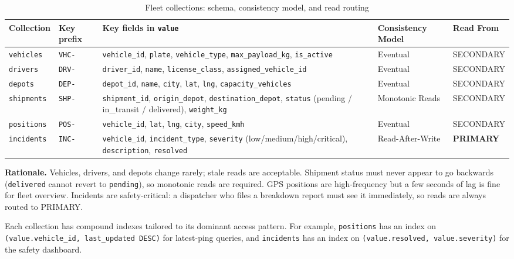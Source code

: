 \documentclass[12pt,a4paper]{article}
\newcommand{\code}[1]{\texttt{\small #1}}
\begin{document}
\begin{table}[H]
  \centering
  \caption{Fleet collections: schema, consistency model, and read routing}
  \label{tab:collections}
  \small
  \begin{tabularx}{\textwidth}{llXll}
    \toprule
    Collection      & Key prefix & Key fields in \texttt{value} & Consistency Model & Read From \\
    \midrule
    \code{vehicles}  & \code{VHC-}  & \texttt{vehicle\_id}, \texttt{plate}, \texttt{vehicle\_type}, \texttt{max\_payload\_kg}, \texttt{is\_active} & Eventual & SECONDARY \\[3pt]
    \code{drivers}   & \code{DRV-}  & \texttt{driver\_id}, \texttt{name}, \texttt{license\_class}, \texttt{assigned\_vehicle\_id} & Eventual & SECONDARY \\[3pt]
    \code{depots}    & \code{DEP-}  & \texttt{depot\_id}, \texttt{name}, \texttt{city}, \texttt{lat}, \texttt{lng}, \texttt{capacity\_vehicles} & Eventual & SECONDARY \\[3pt]
    \code{shipments} & \code{SHP-}  & \texttt{shipment\_id}, \texttt{origin\_depot}, \texttt{destination\_depot}, \texttt{status} (pending / in\_transit / delivered), \texttt{weight\_kg} & Monotonic Reads & SECONDARY \\[3pt]
    \code{positions} & \code{POS-}  & \texttt{vehicle\_id}, \texttt{lat}, \texttt{lng}, \texttt{city}, \texttt{speed\_kmh} & Eventual & SECONDARY \\[3pt]
    \code{incidents} & \code{INC-}  & \texttt{vehicle\_id}, \texttt{incident\_type}, \texttt{severity} (low/medium/high/critical), \texttt{description}, \texttt{resolved} & Read-After-Write & \textbf{PRIMARY} \\
    \bottomrule
  \end{tabularx}
\end{table}

\noindent\textbf{Rationale.}
Vehicles, drivers, and depots change rarely; stale reads are acceptable.
Shipment status must never appear to go backwards (\texttt{delivered} cannot revert to
\texttt{pending}), so monotonic reads are required. GPS positions are high-frequency but
a few seconds of lag is fine for fleet overview. Incidents are safety-critical: a
dispatcher who files a breakdown report must see it immediately, so reads are always
routed to PRIMARY.

Each collection has compound indexes tailored to its dominant access pattern. For
example, \code{positions} has an index on \texttt{(value.vehicle\_id, last\_updated
DESC)} for latest-ping queries, and \code{incidents} has an index on
\texttt{(value.resolved, value.severity)} for the safety dashboard.
\end{document}
